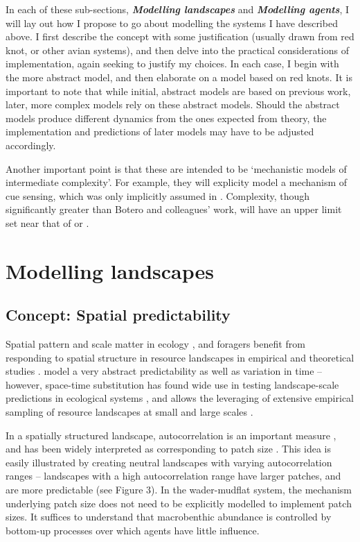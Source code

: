 In each of these sub-sections, \textbf{\emph{Modelling landscapes}} and \textbf{\emph{Modelling agents}}, I will lay out how I propose to go about modelling the systems I have described above. I first describe the concept with some justification (usually drawn from red knot, or other avian systems), and then delve into the practical considerations of implementation, again seeking to justify my choices. In each case, I begin with the more abstract model, and then elaborate on a model based on red knots. It is important to note that while initial, abstract models are based on previous work, later, more complex models rely on these abstract models. Should the abstract models produce different dynamics from the ones expected from theory, the implementation and predictions of later models may have to be adjusted accordingly.

Another important point is that these are intended to be `mechanistic models of intermediate complexity'. For example, they will explicity model a mechanism of cue sensing, which was only implicitly assumed in \citet{botero2015}. Complexity, though significantly greater than Botero and colleagues' work, will have an upper limit set near that of \citet{netz2017} or \citet{vandenberg2015a}.

\section{Modelling landscapes}

\subsection{Concept: Spatial predictability}

Spatial pattern and scale matter in ecology \citep{levin1992}, and foragers benefit from responding to spatial structure in resource landscapes in empirical and theoretical studies \citep{benhamou1992, walsh1996, klaassen2006, vangils2006, vangils2010, oudman2018, bijleveld2016}. \citet{botero2015} model a very abstract predictability as well as variation in time -- however, space-time substitution \citet{blois2013} has found wide use in testing landscape-scale predictions in ecological systems \citep[e.g.][]{hirota2011, staver2011}, and allows the leveraging of extensive empirical sampling of resource landscapes at small \citep[e.g.][]{bijleveld2012} and large scales \citep[e.g.][]{huete2002}.

In a spatially structured landscape, autocorrelation is an important measure \citep{legendre1993}, and has been widely interpreted as corresponding to patch size \citep{kraan2009, kraan2009a, vangils2010, bijleveld2016, oudman2018}. This idea is easily illustrated by creating neutral landscapes with varying autocorrelation ranges -- landscapes with a high autocorrelation range have larger patches, and are more predictable (see Figure 3). In the wader-mudflat system, the mechanism underlying patch size does not need to be explicitly modelled to implement patch sizes. It suffices to understand that macrobenthic abundance is controlled by bottom-up processes over which agents have little influence.

